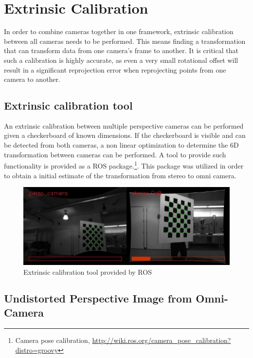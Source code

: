 \chapter{Extrinsic Calibration}
\label{chapter:extrinsic_calibration}

In order to combine cameras together in one framework, extrinsic calibration between all cameras needs to be performed.  This means finding a transformation that can transform data from one camera's frame to another.  It is critical that such a calibration is highly accurate, as even a very small rotational offset will result in a significant reprojection error when reprojecting points from one camera to another.

\section{Extrinsic calibration tool}
\label{sec:ros_tool}

An extrinsic calibration between multiple perspective cameras can be performed given a checkerboard of known dimensions.  If the checkerboard is visible and can be detected from both cameras, a non linear optimization to determine the 6D transformation between cameras can be performed.  A tool to provide such functionality is provided as a ROS package.\footnote{Camera pose calibration, \url{http://wiki.ros.org/camera_pose_calibration?distro=groovy}}.  This package was utilized in order to obtain a initial estimate of the transformation from stereo to omni camera.

\begin{figure}[h!]
  \centering
    \includegraphics[width=1.0\textwidth]{chapters/images/extrinsic_cal_1}
  \caption{Extrinsic calibration tool provided by ROS}
  \label{fig:extrinsic_cal_1}
\end{figure}

\section{Undistorted Perspective Image from Omni-Camera}

